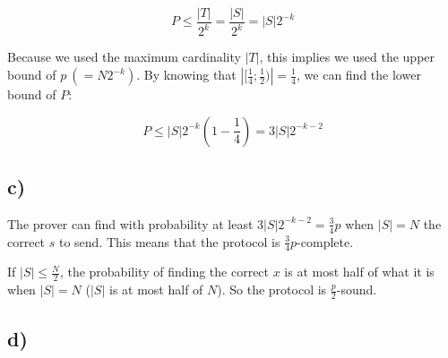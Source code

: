 \documentclass{scrartcl}
\begin{document}
\begin{equation*}
    P \leq \frac{|T|}{2^k} = \frac{|S|}{2^k} = |S|2^{-k}
\end{equation*}

Because we used the maximum cardinality $|T|$, this implies we used the upper bound of $p\ (= N2^{-k})$. By knowing that $|[\frac{1}{4}; \frac{1}{2})| = \frac{1}{4}$, we can find the lower bound of $P$:

\begin{equation*}
    P \leq |S|2^{-k}\left(1- \frac{1}{4} \right) = 3|S|2^{-k-2}
\end{equation*}


\subsection*{c)}

The prover can find with probability at least $3|S|2^{-k-2} = \frac{3}{4}p$ when $|S| = N$ the correct $s$ to send. This means that the protocol is $\frac{3}{4}p$-complete.

If $|S| \leq \frac{N}{2}$, the probability of finding the correct $x$ is at most half of what it is when $|S| = N$ ($|S|$ is at most half of $N$). So the protocol is $\frac{p}{2}$-sound. 


\subsection*{d)}
\end{document}
